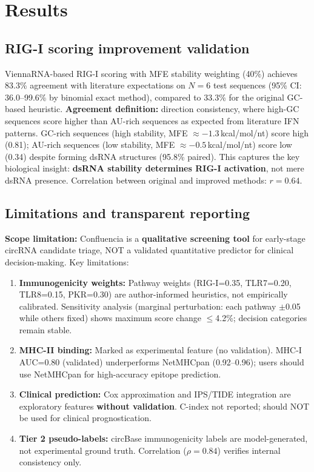 
\section{Results}

\subsection*{RIG-I scoring improvement validation}
ViennaRNA-based RIG-I scoring with MFE stability weighting (40\%) achieves 83.3\% agreement with literature expectations on $N{=}6$ test sequences (95\% CI: 36.0--99.6\% by binomial exact method), compared to 33.3\% for the original GC-based heuristic. \textbf{Agreement definition:} direction consistency, where high-GC sequences score higher than AU-rich sequences as expected from literature IFN patterns. GC-rich sequences (high stability, MFE $\approx -1.3$\,kcal/mol/nt) score high (0.81); AU-rich sequences (low stability, MFE $\approx -0.5$\,kcal/mol/nt) score low (0.34) despite forming dsRNA structures (95.8\% paired). This captures the key biological insight: \textbf{dsRNA stability determines RIG-I activation}, not mere dsRNA presence. Correlation between original and improved methods: $r{=}0.64$.

\subsection*{Limitations and transparent reporting}
\textbf{Scope limitation:} Confluencia is a \textbf{qualitative screening tool} for early-stage circRNA candidate triage, NOT a validated quantitative predictor for clinical decision-making. Key limitations:

\begin{enumerate}[noitemsep,topsep=0pt]
\item \textbf{Immunogenicity weights:} Pathway weights (RIG-I=0.35, TLR7=0.20, TLR8=0.15, PKR=0.30) are author-informed heuristics, not empirically calibrated. Sensitivity analysis (marginal perturbation: each pathway $\pm$0.05 while others fixed) shows maximum score change $\leq$4.2\%; decision categories remain stable.
\item \textbf{MHC-II binding:} Marked as experimental feature (no validation). MHC-I AUC=0.80 (validated) underperforms NetMHCpan (0.92--0.96); users should use NetMHCpan for high-accuracy epitope prediction.
\item \textbf{Clinical prediction:} Cox approximation and IPS/TIDE integration are exploratory features \textbf{without validation}. C-index not reported; should NOT be used for clinical prognostication.
\item \textbf{Tier 2 pseudo-labels:} circBase immunogenicity labels are model-generated, not experimental ground truth. Correlation ($\rho{=}0.84$) verifies internal consistency only.
\end{enumerate}

